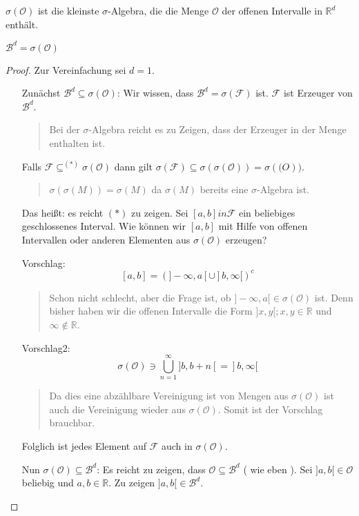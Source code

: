$\sigma(\mathcal O)$ ist die kleinste $\sigma$-Algebra, die die Menge $\mathcal O$ der offenen Intervalle in $\mathbb R^d$ enthält.

\begin{theorem}
$\mathcal B^d = \sigma(\mathcal O)$
\end{theorem}

\begin{proof}
Zur Vereinfachung sei $d=1$.
\begin{itemize}
 \item[Zunächst $\mathcal B^d \subseteq \sigma(\mathcal O)$:]
Wir wissen, dass $\mathcal B^d = \sigma(\mathcal F)$ ist. $\mathcal F$ ist Erzeuger von $\mathcal B^d$.
\begin{quote}
 Bei der $\sigma$-Algebra reicht es zu Zeigen, dass der Erzeuger in der Menge enthalten ist.
\end{quote}
Falls $\mathcal F \subseteq^{(*)} \sigma(\mathcal O)$ dann gilt $\sigma( \mathcal F) \subseteq \sigma( \sigma( \mathcal O)) = \sigma(\mathcal(O))$.
\begin{quote}
 $\sigma(\sigma(M)) = \sigma(M)$ da $\sigma (M)$ bereits eine $\sigma$-Algebra ist.
\end{quote}
Das heißt: es reicht $(*)$ zu zeigen. Sei $[a,b] in \mathcal F$ ein beliebiges geschlossenes Interval. Wie können wir $[a,b]$ mit Hilfe von offenen Intervallen oder anderen Elementen aus $\sigma(\mathcal O)$ erzeugen?

Vorschlag:
$$ [a,b] = ( ]-\infty, a[ \cup ]b,\infty[ )^c$$
\begin{quote}
 Schon nicht schlecht, aber die Frage ist, ob $]-\infty, a[ \in \sigma(\mathcal O)$ ist. Denn bisher haben wir die offenen Intervalle die Form $]x,y[; x,y \in \mathbb R$ und $\infty \notin \mathbb R$.
\end{quote}

Vorschlag2:
$$ \sigma(\mathcal O) \ni \bigcup_{n=1}^\infty ]b,b+n[ = ]b,\infty[ $$
\begin{quote}
 Da dies eine abzählbare Vereinigung ist von Mengen aus $\sigma(\mathcal O)$ ist auch die Vereinigung wieder aus $\sigma(\mathcal O)$. Somit ist der Vorschlag brauchbar.
\end{quote}
Folglich ist jedes Element auf $\mathcal F$ auch in $\sigma(\mathcal O)$.
\item[Nun $\sigma(\mathcal O) \subseteq \mathcal B^d$:]
Es reicht zu zeigen, dass $\mathcal O \subseteq \mathcal B^d$ ( wie eben ). Sei $]a,b[ \in \mathcal O$ beliebig und $a,b \in \mathbb R$. Zu zeigen $]a,b[ \in \mathcal B^d$.


\end{itemize}
\end{proof}
